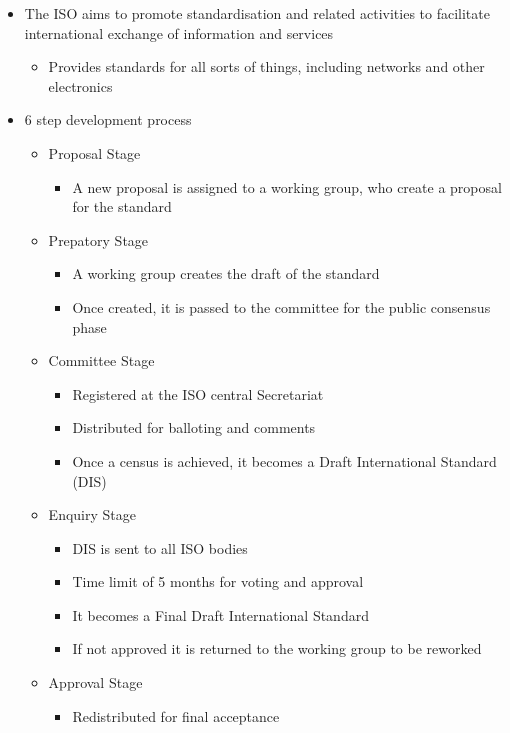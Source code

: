 \begin{itemize}
  \item The ISO aims to promote standardisation and related activities to facilitate international exchange of information and services
  \begin{itemize}
    \item Provides standards for all sorts of things, including networks and other electronics
  \end{itemize}
  \item 6 step development process
  \begin{itemize}
    \item Proposal Stage
    \begin{itemize}
      \item A new proposal is assigned to a working group, who create a proposal for the standard
    \end{itemize}
    \item Prepatory Stage
    \begin{itemize}
      \item A working group creates the draft of the standard
      \item Once created, it is passed to the committee for the public consensus phase
    \end{itemize}
    \item Committee Stage
    \begin{itemize}
      \item Registered at the ISO central Secretariat
      \item Distributed for balloting and comments
      \item Once a census is achieved, it becomes a Draft International Standard (DIS)
    \end{itemize}
    \item Enquiry Stage
    \begin{itemize}
      \item DIS is sent to all ISO bodies
      \item Time limit of 5 months for voting and approval
      \item It becomes a Final Draft International Standard
      \item If not approved it is returned to the working group to be reworked
    \end{itemize}
    \item Approval Stage
    \begin{itemize}
      \item Redistributed for final acceptance

\end{itemize}
\end{itemize}
\end{itemize}
